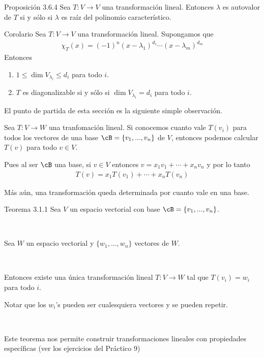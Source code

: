 \documentclass[handout]{beamer} %
\begin{document}
\begin{frame}
	\begin{block}{Proposición 3.6.4}
		Sea $T:V\longrightarrow V$ una transformación lineal. Entonces
		$\lambda$ es autovalor de $T$ si y sólo si $\lambda$ es raíz del polinomio característico.
	\end{block}\pause
	
	\begin{block}{Corolario}
		Sea $T:V\longrightarrow V$ una transformación lineal. Supongamos que 
		\begin{align*}
			\chi_T(x)=(-1)^n (x-\lambda_1)^{d_1}\cdots (x-\lambda_m)^{d_m}
		\end{align*}
		Entonces 
		\begin{enumerate}
			\item $1\leq\dim V_{\lambda_i}\leq d_i$ para todo $i$.
			\item $T$ es diagonalizable si y sólo si $\dim V_{\lambda_i}=d_i$ para todo $i$.
		\end{enumerate}
	\end{block}
\end{frame}


\begin{frame}
	
	El punto de partida de esta sección es la siguiente simple observación.\pause
	
	\begin{observacion}
		Sea $T:V\longrightarrow W$ una tranfomación lineal. Si conocemos cuanto vale $T(v_i)$ para todos los vectores de una base $\cB=\{v_1, ..., v_n\}$ de $V$, entonces podemos calcular $T(v)$ para todo $v\in V$.
	\end{observacion} \pause
	
	Pues al ser $\cB$ una base, si $v\in V$ entonces $v=x_1v_1+\cdots+ x_nv_n$ y por lo tanto
	\begin{align*}
		T(v)=x_1T(v_1)+\cdots+ x_nT(v_n) 
	\end{align*}
	
\end{frame}

\begin{frame}
	Más aún, una transformación queda determinada por cuanto vale en una base.\pause
	
	\begin{block}{Teorema 3.1.1}
		Sea $V$ un espacio vectorial con base $\cB=\{v_1, ..., v_n\}$.
		
		\
		
		Sea $W$ un espacio vectorial y $\{w_1, ..., w_n\}$ vectores de $W$.
		
		\
		
		Entonces existe una única transformación lineal $T:V\longrightarrow W$ tal que $T(v_i)=w_i$ para todo $i$.
	\end{block}
	\pause

	
	Notar que los $w_i$'s pueden ser cualesquiera vectores y se pueden repetir. 
	
	\

	\pause
	Este teorema nos permite construir transformaciones lineales con propiedades específicas (ver los ejercicios del Práctico 9)
\end{frame}
\end{document}
